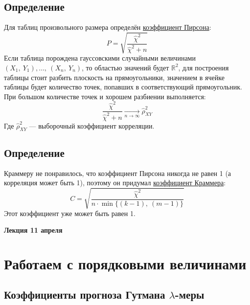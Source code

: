 \documentclass[12pt, a4paper]{article}
\begin{document}
\subsection*{Определение}
Для таблиц произвольного размера определён \underline{коэффициент Пирсона}:
\[P = \sqrt{\frac{\hat \chi^2}{\hat \chi^2 + n}}\]
Если таблица порождена гауссовскими случайными величинами $(X_1,\ Y_1),\dots,\ (X_n,\ Y_n)$, то областью значений будет $\mathbb{R}^2$, для построения таблицы стоит разбить плоскость на прямоугольники, значением в ячейке таблицы будет количество точек, попавших в соответствующий прямоугольник. При большом количестве точек и хорошем разбиении выполняется:
\[\frac{\hat \chi^2}{\hat \chi^2 + n} \xrightarrow[n\to\infty]{} \hat \rho^2_{X Y}\]
Где $\hat \rho_{XY}^2$ --- выборочный коэффициент корреляции.\\
\subsection*{Определение}
Краммеру не понравилось, что коэффициент Пирсона никогда не равен 1 (а корреляция может быть 1), поэтому он придумал \underline{коэффициент Краммера}:
\[C = \sqrt{\frac{\hat \chi^2}{n \cdot \min \{ (k - 1),\ (m - 1) \}}}\]
Этот коэффициент уже может быть равен 1.

\begin{center}
    \bf Лекция 11 апреля
\end{center}
\section*{Работаем с порядковыми величинами}
\subsection*{Коэффициенты прогноза Гутмана $\lambda$-меры}
\end{document}
